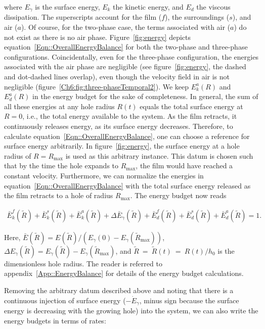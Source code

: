 \noindent where $E_\gamma$ is the surface energy, $E_k$ the kinetic energy, and $E_d$ the viscous dissipation. The superscripts account for the film ($f$), the surroundings ($s$), and air ($a$). Of course, for the two-phase case, the terms associated with air ($a$) do not exist as there is no air phase. Figure~\ref{fig:energy} depicts equation~\eqref{Eqn::OverallEnergyBalance} for both the two-phase and three-phase configurations. Coincidentally, even for the three-phase configuration, the energies associated with the air phase are negligible (see figure~\ref{fig:energy}, the dashed and dot-dashed lines overlap), even though the velocity field in air is not negligible (figure~\ref{Ch6:fig:three-phaseTemporal2}). We keep $E^a_k(R)$ and $E^a_d(R)$ in the energy budget for the sake of completeness. In general, the sum of all these energies at any hole radius $R(t)$ equals the total surface energy at $R = 0$, i.e., the total energy available to the system. As the film retracts, it continuously releases energy, as its surface energy decreases. Therefore, to calculate equation~\eqref{Eqn::OverallEnergyBalance}, one can choose a reference for surface energy arbitrarily. In figure~\ref{fig:energy}, the surface energy at a hole radius of $R = R_{\text{max}}$ is used as this arbitrary instance. This datum is chosen such that by the time the hole expands to $R_{\text{max}}$, the film would have reached a constant velocity. Furthermore, we can normalize the energies in equation~\eqref{Eqn::OverallEnergyBalance} with the total surface energy released as the film retracts to a hole of radius $R_{\text{max}}$. The energy budget now reads 

\begin{align}
	\bar{E}_k^f(\tilde{R}) + \bar{E}_k^s(\tilde{R}) + \bar{E}_k^a(\tilde{R}) + \Delta \bar{E}_\gamma(\tilde{R}) + \bar{E}_d^f(\tilde{R}) + \bar{E}_d^s(\tilde{R}) + \bar{E}_d^a(\tilde{R}) = 1.
	\label{Eqn::OverallEnergyBalance2}
\end{align}

\noindent Here, $\bar{E}(\tilde{R}) = E(\tilde{R})/(E_\gamma(0)-E_\gamma(\tilde{R}_{\text{max}}))$, $\Delta E_{\gamma}(\tilde{R}) = E_{\gamma}(\tilde{R}) - E_{\gamma}(\tilde{R}_{\text{max}})$, and $\tilde{R}~=~\tilde{R}(t)~=~R(t)/h_{0}$ is the dimensionless hole radius. The reader is referred to appendix~\ref{App::EnergyBalance} for details of the energy budget calculations. 

Removing the arbitrary datum described above and noting that there is a continuous injection of surface energy ($-\dot{E}_\gamma$, minus sign because the surface energy is decreasing with the growing hole) into the system, we can also write the energy budgets in terms of rates:

